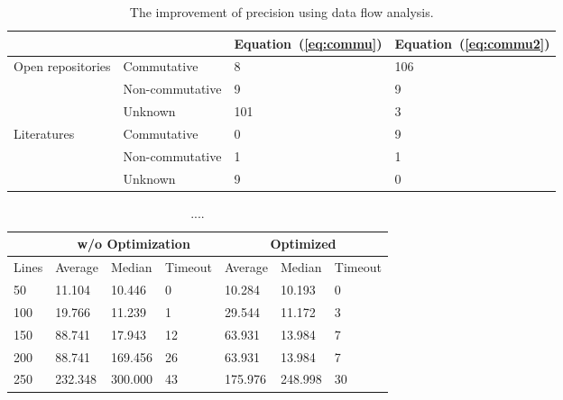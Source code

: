 \documentclass{llncs}
\begin{document}
\begin{table}
	\centering
	\begin{tabular}{|l|l|l|l|}
		\hline
		& &Equation~(\ref{eq:commu})	& Equation~(\ref{eq:commu2}) \\
		\hline
		\hline
		\multirow{3}{*}{Open repositories}&Commutative& 8&106\\ 
		\cline{2-4}
		&Non-commutative&9&9\\
		\cline{2-4}
		&Unknown&101&3\\
		\hline
		\hline
		\multirow{3}{*}{Literatures}&Commutative& 0&9\\
		\cline{2-4}
		&Non-commutative&1&1\\
		\cline{2-4}
		&Unknown&9&0\\
		\hline
	\end{tabular}
	\caption{The improvement of precision using data flow analysis.}
	\label{tab:opt1}
\end{table}


\begin{table}
	\begin{tabular}{|l|l|l|l|l|l|l|}
\hline
		& \multicolumn{3}{c|}{\small w/o Optimization}	& \multicolumn{3}{c|}{\small Optimized} \\
\hline
		\small Lines & \small Average & \small Median & \small Timeout & \small Average & \small Median & \small Timeout \\
\hline
\hline
		50	&	11.104	&	10.446	&	0	&	10.284	&	10.193	&	0	\\
\hline                                                                              
		100	&	19.766	&	11.239	&	1	&	29.544	&	11.172	&	3	\\
\hline                                                                             
		150	&	88.741	&	17.943	&	12	&	63.931	&	13.984	&	7	\\
\hline                                                                             
		200	&	88.741	&	169.456	&	26	&	63.931	&	13.984	&	7	\\
\hline                                                                             
		250	&	232.348	&	300.000	&	43	&	175.976	&	248.998	&	30	\\
\hline
	\end{tabular}
	\caption{....}
	\label{tab:opt2}
\end{table}

\end{document}
